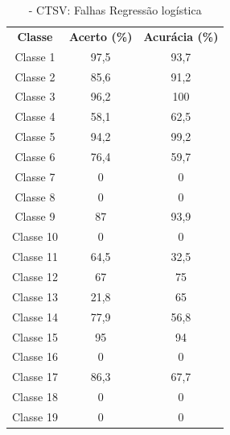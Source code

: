 \begin{itemize}
 \begin{table}[ht]
\centering
\begin{tabular}{ccc}
\textbf{Classe} & \textbf{Acerto (\%)} & \textbf{Acurácia (\%)} \\
Classe 1        & 97,5                  & 93,7                    \\
Classe 2        & 85,6                  & 91,2                    \\
Classe 3        & 96,2                  & 100                    \\
Classe 4        & 58,1                  & 62,5                    \\
Classe 5        & 94,2                 & 99,2                    \\
Classe 6        & 76,4                  & 59,7                    \\
Classe 7        & 0                  & 0                    \\
Classe 8        & 0                  & 0                    \\
Classe 9        & 87                  & 93,9                    \\
Classe 10       & 0                  & 0                    \\
Classe 11       & 64,5            & 32,5   
     \\
Classe 12       & 67                 & 75   
     \\
Classe 13      & 21,8                 & 65    
     \\
Classe 14       &  77,9                & 56,8   
     \\
Classe 15       & 95                 & 94
     \\
Classe 16       & 0                &    0
     \\
Classe 17       & 86,3                & 67,7
     \\
Classe 18     &  0              &    0 
     \\
Classe 19       & 0                 & 0                                 
\end{tabular}
\caption{\label{tab:ctsvnlogistic}- CTSV: Falhas Regressão logística}
\end{table}



\end{itemize}
